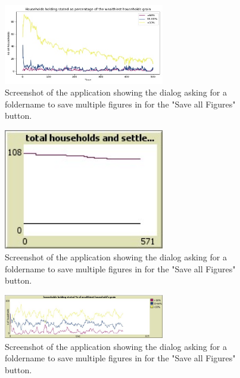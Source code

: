 \documentclass[12pt]{article}
\begin{document}
	\begin{figure}[!htb]
		\includegraphics[width=7cm]{Land_rental_enabled_run1_B}
		\caption{Screenshot of the application showing the dialog asking for a foldername to save multiple figures in for the "Save all Figures" button.}
		\label{fig:Land_rental_enabled_run1_B}
	\end{figure}

	\begin{figure}[!htb]
		\includegraphics[width=7cm]{Land_rental_enabled_run1_C}
		\caption{Screenshot of the application showing the dialog asking for a foldername to save multiple figures in for the "Save all Figures" button.}
		\label{fig:Land_rental_enabled_run1_C}
	\end{figure}

	\begin{figure}[!htb]
		\includegraphics[width=7cm]{Land_rental_enabled_run1_D}
		\caption{Screenshot of the application showing the dialog asking for a foldername to save multiple figures in for the "Save all Figures" button.}
		\label{fig:Land_rental_enabled_run1_D}
	\end{figure}
\end{document}
